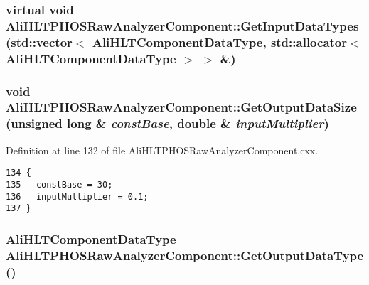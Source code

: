 \subsubsection{\setlength{\rightskip}{0pt plus 5cm}virtual void Ali\-HLTPHOSRaw\-Analyzer\-Component::Get\-Input\-Data\-Types (std::vector$<$ Ali\-HLTComponent\-Data\-Type, std::allocator$<$ Ali\-HLTComponent\-Data\-Type $>$ $>$ \&)\hspace{0.3cm}{\tt  [virtual, inherited]}}\label{classAliHLTPHOSRawAnalyzerComponent_AliHLTPHOSRawAnalyzerPeakFinderComponenta13}


\subsubsection{\setlength{\rightskip}{0pt plus 5cm}void Ali\-HLTPHOSRaw\-Analyzer\-Component::Get\-Output\-Data\-Size (unsigned long \& {\em const\-Base}, double \& {\em input\-Multiplier})\hspace{0.3cm}{\tt  [virtual, inherited]}}\label{classAliHLTPHOSRawAnalyzerComponent_AliHLTPHOSRawAnalyzerPeakFinderComponenta15}




Definition at line 132 of file Ali\-HLTPHOSRaw\-Analyzer\-Component.cxx.

\footnotesize\begin{verbatim}134 {
135   constBase = 30;
136   inputMultiplier = 0.1;
137 }
\end{verbatim}\normalsize 


\subsubsection{\setlength{\rightskip}{0pt plus 5cm}Ali\-HLTComponent\-Data\-Type Ali\-HLTPHOSRaw\-Analyzer\-Component::Get\-Output\-Data\-Type ()\hspace{0.3cm}{\tt  [virtual, inherited]}}\label{classAliHLTPHOSRawAnalyzerComponent_AliHLTPHOSRawAnalyzerPeakFinderComponenta14}




